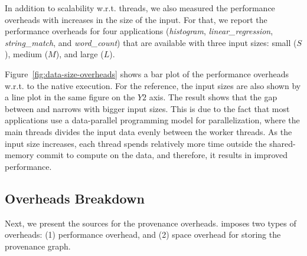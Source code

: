 
%










 In addition to scalability w.r.t.  threads, we also measured the performance overheads with increases in the size of the input.  For that, we
report the performance overheads for four applications ({\em histogram}, {\em linear\_regression}, {\em string\_match}, and {\em word\_count}) that are available with
three input sizes: small ($S$), medium ($M$), and large ($L$).


Figure~\ref{fig:data-size-overheads} shows a bar plot of the performance overheads w.r.t. to the native \pthreads execution. For the reference, the input sizes are also shown by a line plot in the same figure on the $Y2$ axis. The result shows that the gap between \pthreads and \projecttitle narrows with bigger input sizes. This is due to the fact that most applications use a data-parallel programming model for parallelization, where the main threads divides the input data evenly between the worker threads. As the input size increases, each thread spends relatively more time outside the shared-memory commit to compute on the data, and therefore, it results in improved performance.
 

%





\subsection{Overheads Breakdown}
\label{subsec:overheads-breakdown}
Next, we present  the sources for the provenance overheads. \projecttitle imposes two types of overheads: (1) performance overhead, and (2) space overhead for storing the provenance graph.


